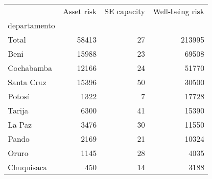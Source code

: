 \begin{tabular}{lrrr}
\toprule
{} &  Asset risk &  SE capacity &  Well-being risk \\
departamento &             &              &                  \\
\midrule
Total        &       58413 &           27 &           213995 \\
Beni         &       15988 &           23 &            69508 \\
Cochabamba   &       12166 &           24 &            51770 \\
Santa Cruz   &       15396 &           50 &            30500 \\
Potosí       &        1322 &            7 &            17728 \\
Tarija       &        6300 &           41 &            15390 \\
La Paz       &        3476 &           30 &            11550 \\
Pando        &        2169 &           21 &            10324 \\
Oruro        &        1145 &           28 &             4035 \\
Chuquisaca   &         450 &           14 &             3188 \\
\bottomrule
\end{tabular}
